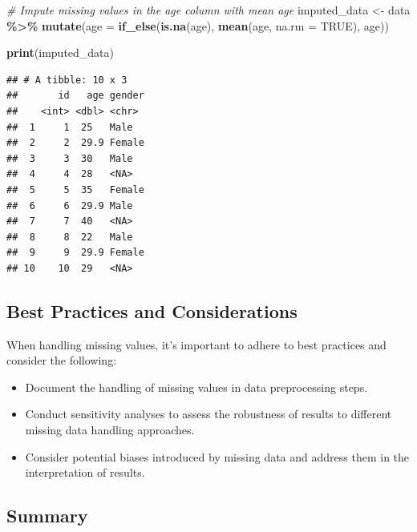 \documentclass[
]{book}
\newenvironment{Shaded}{\begin{snugshade}}{\end{snugshade}}
\newcommand{\AttributeTok}[1]{\textcolor[rgb]{0.13,0.29,0.53}{#1}}
\newcommand{\CommentTok}[1]{\textcolor[rgb]{0.56,0.35,0.01}{\textit{#1}}}
\newcommand{\ConstantTok}[1]{\textcolor[rgb]{0.56,0.35,0.01}{#1}}
\newcommand{\FunctionTok}[1]{\textcolor[rgb]{0.13,0.29,0.53}{\textbf{#1}}}
\newcommand{\NormalTok}[1]{#1}
\newcommand{\OtherTok}[1]{\textcolor[rgb]{0.56,0.35,0.01}{#1}}
\newcommand{\SpecialCharTok}[1]{\textcolor[rgb]{0.81,0.36,0.00}{\textbf{#1}}}
\begin{document}
\begin{Shaded}
\begin{Highlighting}[]
\CommentTok{\# Impute missing values in the age column with mean age}
\NormalTok{imputed\_data }\OtherTok{\textless{}{-}}\NormalTok{ data }\SpecialCharTok{\%\textgreater{}\%}
  \FunctionTok{mutate}\NormalTok{(}\AttributeTok{age =} \FunctionTok{if\_else}\NormalTok{(}\FunctionTok{is.na}\NormalTok{(age), }\FunctionTok{mean}\NormalTok{(age, }\AttributeTok{na.rm =} \ConstantTok{TRUE}\NormalTok{), age))}

\FunctionTok{print}\NormalTok{(imputed\_data)}
\end{Highlighting}
\end{Shaded}

\begin{verbatim}
## # A tibble: 10 x 3
##       id   age gender
##    <int> <dbl> <chr> 
##  1     1  25   Male  
##  2     2  29.9 Female
##  3     3  30   Male  
##  4     4  28   <NA>  
##  5     5  35   Female
##  6     6  29.9 Male  
##  7     7  40   <NA>  
##  8     8  22   Male  
##  9     9  29.9 Female
## 10    10  29   <NA>
\end{verbatim}

\hypertarget{best-practices-and-considerations}{%
\subsection{\texorpdfstring{\textbf{Best Practices and Considerations}}{Best Practices and Considerations}}\label{best-practices-and-considerations}}

When handling missing values, it's important to adhere to best practices and consider the following:

\begin{itemize}
\item
  Document the handling of missing values in data preprocessing steps.
\item
  Conduct sensitivity analyses to assess the robustness of results to different missing data handling approaches.
\item
  Consider potential biases introduced by missing data and address them in the interpretation of results.
\end{itemize}

\hypertarget{summary-7}{%
\subsection{\texorpdfstring{\textbf{Summary}}{Summary}}\label{summary-7}}
\end{document}
